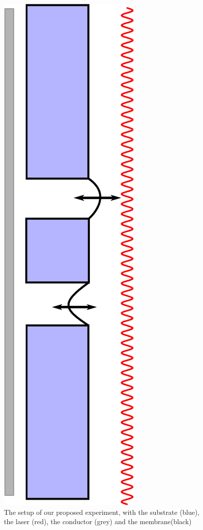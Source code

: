 \begin{figure}[H]
  \centering
  \includegraphics[width=0.3\columnwidth]{Figures/Fuck_dig_christoffer.eps}
  \caption{The setup of our proposed experiment, with the substrate (blue), the laser (red), the conductor (grey) and the membrane(black)}
  \label{FDC}
\end{figure}